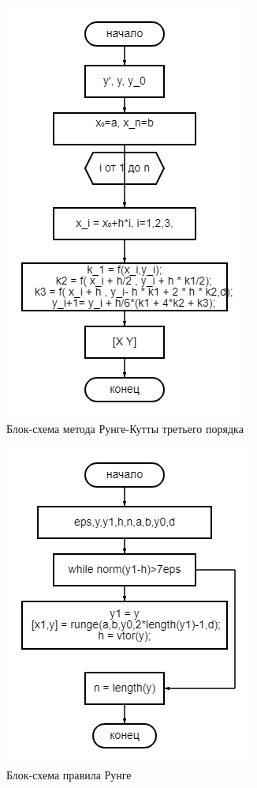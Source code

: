 \documentclass[a4paper]{article}
\begin{document}
\begin{figure}[h!]
\begin{center}
\includegraphics[scale=0.7]{diagram (6).png} 
\end{center}
\caption{Блок-схема метода Рунге-Кутты третьего порядка} \label{Рис1}
\end{figure}

\begin{figure}[h!]
\begin{center}
\includegraphics[scale=0.7]{diagram (6)1.png} 
\end{center}
\caption{Блок-схема правила Рунге} \label{Рис2}
\end{figure}
\newpage
\end{document}
